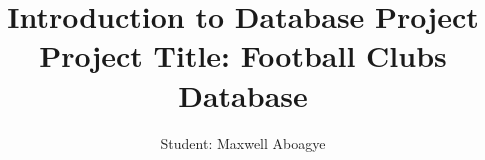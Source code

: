 \documentclass{article}[h]
\title{\huge Introduction to Database Project\\
    \vspace{6px}
    \huge \textbf {Project Title: Football Clubs Database}}
\author{Student: Maxwell Aboagye}
\begin{document}
\maketitle

\tableofcontents

\pagebreak


% 
% 
% 
% 
\end{document}
